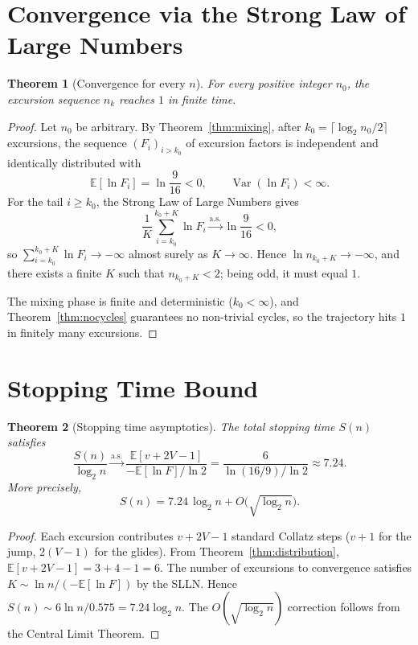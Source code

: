 \documentclass[12pt,a4paper]{article}
\newtheorem{theorem}{Theorem}[section]
\newcommand{\E}{\mathbb{E}}
\DeclareMathOperator{\Var}{Var}
\begin{document}
\section{Convergence via the Strong Law of Large Numbers}\label{sec:convergence}

\begin{theorem}[Convergence for every $n$]\label{thm:convergence}
For every positive integer $n_0$, the excursion sequence $n_k$ reaches $1$ in finite time.
\end{theorem}

\begin{proof}
Let $n_0$ be arbitrary. By Theorem~\ref{thm:mixing}, after $k_0 = \lceil \log_2 n_0 / 2 \rceil$ excursions, the sequence $(F_i)_{i > k_0}$ of excursion factors is independent and identically distributed with
\[
\E[\ln F_i] = \ln\frac{9}{16} < 0, \qquad \Var(\ln F_i) < \infty.
\]
For the tail $i \ge k_0$, the Strong Law of Large Numbers gives
\[
\frac{1}{K}\sum_{i=k_0}^{k_0+K} \ln F_i \xrightarrow{\text{a.s.}} \ln\frac{9}{16} < 0,
\]
so $\sum_{i=k_0}^{k_0+K} \ln F_i \to -\infty$ almost surely as $K \to \infty$. Hence $\ln n_{k_0+K} \to -\infty$, and there exists a finite $K$ such that $n_{k_0+K} < 2$; being odd, it must equal $1$.

The mixing phase is finite and deterministic ($k_0 < \infty$), and Theorem~\ref{thm:nocycles} guarantees no non-trivial cycles, so the trajectory hits $1$ in finitely many excursions.
\end{proof}

\section{Stopping Time Bound}\label{sec:stopping}

\begin{theorem}[Stopping time asymptotics]\label{thm:stopping}
The total stopping time $S(n)$ satisfies
\[
\frac{S(n)}{\log_2 n} \xrightarrow{\text{a.s.}} \frac{\E[v + 2V - 1]}{-\E[\ln F] / \ln 2} = \frac{6}{\ln(16/9)/\ln 2} \approx 7.24.
\]
More precisely,
\[
S(n) = 7.24\,\log_2 n + O\bigl(\sqrt{\log_2 n}\bigr).
\]
\end{theorem}

\begin{proof}
Each excursion contributes $v + 2V - 1$ standard Collatz steps ($v+1$ for the jump, $2(V-1)$ for the glides). From Theorem~\ref{thm:distribution}, $\E[v + 2V - 1] = 3 + 4 - 1 = 6$. The number of excursions to convergence satisfies $K \sim \ln n / (-\E[\ln F])$ by the SLLN. Hence $S(n) \sim 6 \ln n / 0.575 = 7.24\log_2 n$. The $O(\sqrt{\log_2 n})$ correction follows from the Central Limit Theorem.
\end{proof}
\end{document}
